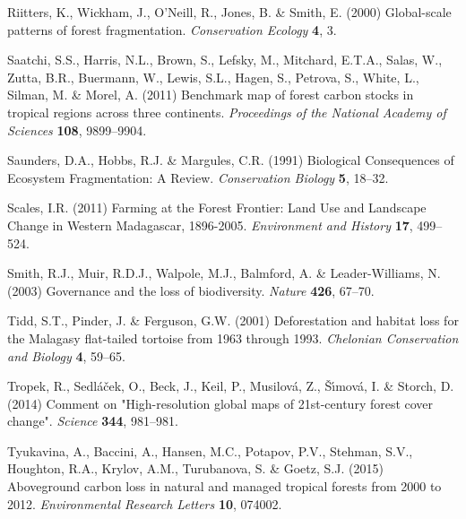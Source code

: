 \documentclass[a4paper, 12pt, leqno]{article}\usepackage[]{graphicx}\usepackage[]{color}
\begin{document}
\begin{thebibliography}{60}
Riitters, K., Wickham, J., O'Neill, R., Jones, B. \& Smith, E. (2000)
  Global-scale patterns of forest fragmentation. \emph{Conservation Ecology}
  \textbf{4}, 3.

Saatchi, S.S., Harris, N.L., Brown, S., Lefsky, M., Mitchard, E.T.A., Salas,
  W., Zutta, B.R., Buermann, W., Lewis, S.L., Hagen, S., Petrova, S., White,
  L., Silman, M. \& Morel, A. (2011) Benchmark map of forest carbon stocks in
  tropical regions across three continents. \emph{Proceedings of the National
  Academy of Sciences} \textbf{108}, 9899--9904.

Saunders, D.A., Hobbs, R.J. \& Margules, C.R. (1991) {Biological Consequences
  of Ecosystem Fragmentation: A Review}. \emph{Conservation Biology}
  \textbf{5}, 18--32.

Scales, I.R. (2011) {Farming at the Forest Frontier: Land Use and Landscape
  Change in Western Madagascar, 1896-2005}. \emph{Environment and History}
  \textbf{17}, 499--524.

Smith, R.J., Muir, R.D.J., Walpole, M.J., Balmford, A. \& Leader-Williams, N.
  (2003) Governance and the loss of biodiversity. \emph{Nature} \textbf{426},
  67--70.

Tidd, S.T., Pinder, J. \& Ferguson, G.W. (2001) {Deforestation and habitat loss
  for the Malagasy flat-tailed tortoise from 1963 through 1993}.
  \emph{Chelonian Conservation and Biology} \textbf{4}, 59--65.

Tropek, R., Sedl{\'a}{\v c}ek, O., Beck, J., Keil, P., Musilov{\'a}, Z., {\v
  S}{\'\i}mov{\'a}, I. \& Storch, D. (2014) {Comment on "High-resolution global
  maps of 21st-century forest cover change"}. \emph{Science} \textbf{344},
  981--981.

Tyukavina, A., Baccini, A., Hansen, M.C., Potapov, P.V., Stehman, S.V.,
  Houghton, R.A., Krylov, A.M., Turubanova, S. \& Goetz, S.J. (2015)
  Aboveground carbon loss in natural and managed tropical forests from 2000 to
  2012. \emph{Environmental Research Letters} \textbf{10}, 074002.


\end{thebibliography}
\end{document}
